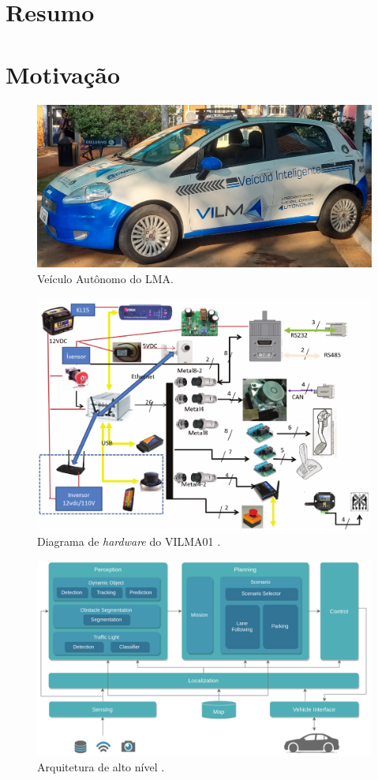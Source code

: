 \section{Resumo}



\clearpage

\section{Motivação}


\begin{figure}[H]
	\centering
	\includegraphics[width=0.5\linewidth]{img/vilma}
	\caption{Veículo Autônomo do LMA.}
	\label{fig:vilma}
\end{figure}

\begin{figure}[H]
	\centering
	\includegraphics[width=0.75\linewidth]{img/diagrama_vilma}
	\caption{Diagrama de \textit{hardware} do VILMA01 \cite{bedoya_alise_2016}.}
	\label{fig:diagrama_vilma}
\end{figure}

\begin{figure}
	\centering
	\includegraphics[width=0.8\linewidth]{img/HL_architecture}
	\caption{Arquitetura de alto nível \cite{autowareArchitecture}.}
	\label{fig:hlarchitecture}
\end{figure}


